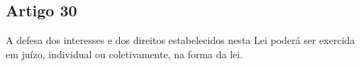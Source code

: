 \subsection{Artigo 30}
A defesa dos interesses e dos direitos estabelecidos nesta Lei poderá ser exercida em juízo, individual ou coletivamente, na forma da lei.